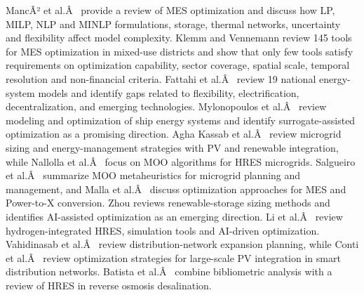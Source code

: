 MancÃ² et al.Â~\cite{Manco2024} provide a review of MES optimization and discuss how LP,
MILP, NLP and MINLP formulations, storage, thermal networks, uncertainty
and flexibility affect model complexity. Klemm and Vennemann \cite{Klemm2021} review 145 tools
for MES optimization in mixed-use districts and show that only few tools
satisfy requirements on optimization capability, sector coverage,
spatial scale, temporal resolution and non-financial criteria.
Fattahi et al.Â~\cite{Fattahi2020} review 19 national energy-system models and identify gaps
related to flexibility, electrification, decentralization, and emerging
technologies. Mylonopoulos et al.Â~\cite{Mylonopoulos202332697} review modeling and optimization
of ship energy systems and identify surrogate-assisted optimization as a
promising direction. Agha Kassab et al.Â~\cite{agha_kassab_comprehensive_2024} review microgrid
sizing and energy-management strategies with PV and renewable
integration, while Nallolla et al.Â~\cite{nallolla_multi-objective_2023} focus on MOO
algorithms for HRES microgrids. Salgueiro et
al.Â~\cite{salgueiro_multi-objective_2019}
summarize MOO metaheuristics for microgrid planning and management, and
Malla et al.Â~\cite{malla_sg_optimization_2024} discuss optimization approaches for MES
and Power-to-X conversion. Zhou \cite{Zhou2024__2} reviews renewable-storage
sizing methods and identifies AI-assisted optimization as an emerging
direction. Li et al.Â~\cite{Li2025_hydrogen} review hydrogen-integrated HRES,
simulation tools and AI-driven optimization.
Vahidinasab et al.Â~\cite{vahidinasab_overview_2020} review distribution-network expansion
planning, while Conti et al.Â~\cite{Conti2026} review optimization strategies for
large-scale PV integration in smart distribution networks.
Batista et al.Â~\cite{batista_optimizing_2023} combine bibliometric analysis with a review
of HRES in reverse osmosis desalination.
